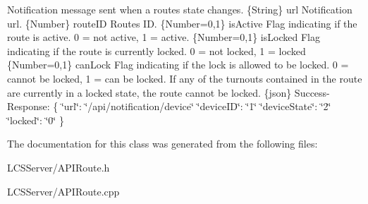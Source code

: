 Notification message sent when a route\textquotesingle{}s state changes.  \{String\} url Notification url.  \{Number\} route\+ID Route\textquotesingle{}s ID.  \{Number=0,1\} is\+Active Flag indicating if the route is active. 0 = not active, 1 = active.  \{Number=0,1\} is\+Locked Flag indicating if the route is currently locked. 0 = not locked, 1 = locked  \{Number=0,1\} can\+Lock Flag indicating if the lock is allowed to be locked. 0 = cannot be locked, 1 = can be locked. If any of the turnouts contained in the route are currently in a locked state, the route cannot be locked.  \{json\} Success-\/\+Response\+: \{ \char`\"{}url\char`\"{}\+: \char`\"{}/api/notification/device\char`\"{} \char`\"{}device\+I\+D\char`\"{}\+: \char`\"{}1\char`\"{} \char`\"{}device\+State\char`\"{}\+: \char`\"{}2\char`\"{} \char`\"{}locked\char`\"{}\+: \char`\"{}0\char`\"{} \} 

The documentation for this class was generated from the following files\+:\begin{DoxyCompactItemize}
\item 
L\+C\+S\+Server/A\+P\+I\+Route.\+h\item 
L\+C\+S\+Server/A\+P\+I\+Route.\+cpp\end{DoxyCompactItemize}
